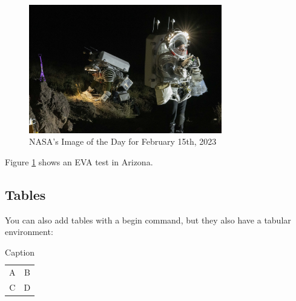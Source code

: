 \documentclass{article}  %
\begin{document}
\begin{figure}[h]  %
    \centering
    \includegraphics[width=0.75\textwidth]{wjs_2270_orig.jpg}
    \caption{NASA's Image of the Day for February 15th, 2023}  %
    \label{fig:NASAIOTD}  %
\end{figure}


Figure \ref{fig:NASAIOTD} shows an EVA test in Arizona.

\subsection{Tables}
You can also add tables with a begin command, but they also have a tabular environment:  %

\begin{table}[h]
    \centering
    \begin{tabular}{|c|c|} %
        A & B \\  %
        C & D \\ \hline
    \end{tabular}
    \caption{Caption}
    \label{tab:test}
\end{table}
\end{document}
